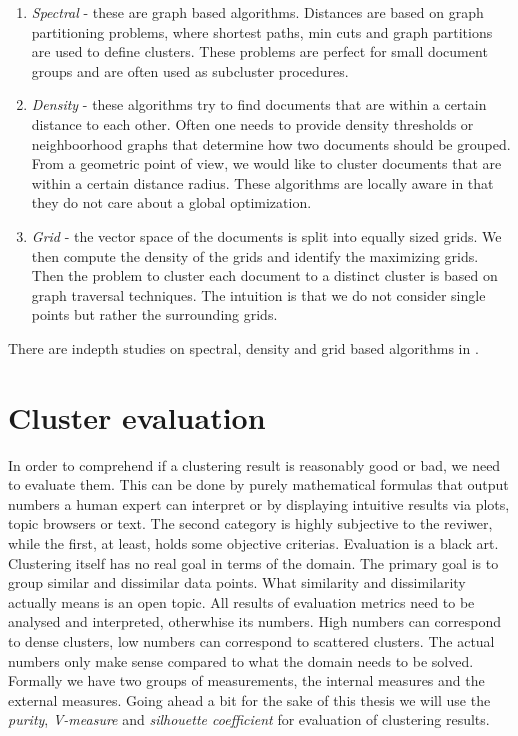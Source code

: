       \begin{enumerate}
        \item \emph{Spectral} - these are graph based algorithms. Distances are based on graph partitioning problems, where shortest paths, min cuts and graph partitions are used to define clusters. These problems are perfect for small document groups and are often used as subcluster procedures.
        \item \emph{Density} - these algorithms try to find documents that are within a certain distance to each other. Often one needs to provide density thresholds or neighboorhood graphs that determine how two documents should be grouped. From a geometric point of view, we would like to cluster documents that are within a certain distance radius. These algorithms are locally aware in that they do not care about a global optimization.
        \item \emph{Grid} - the vector space of the documents is split into equally sized grids. We then compute the density of the grids and identify the maximizing grids. Then the problem to cluster each document to a distinct cluster is based on graph traversal techniques. The intuition is that we do not consider single points but rather the surrounding grids.
      \end{enumerate}

    There are indepth studies on spectral, density and grid based algorithms in \cite{ClusteringBooAggarwalk2013}.


\section{Cluster evaluation}
\label{sec:evaluation}

  In order to comprehend if a clustering result is reasonably good or bad, we need to evaluate them. This can be done by purely mathematical formulas that output numbers a human expert can interpret or by displaying intuitive results via plots, topic browsers or text. The second category is highly subjective to the reviwer, while the first, at least, holds some objective criterias. Evaluation is a black art. Clustering itself has no real goal in terms of the domain. The primary goal is to group similar and dissimilar data points. What similarity and dissimilarity actually means is an open topic. All results of evaluation metrics need to be analysed and interpreted, otherwhise its numbers. High numbers can correspond to dense clusters, low numbers can correspond to scattered clusters. The actual numbers only make sense compared to what the domain needs to be solved.\\
  Formally we have two groups of measurements, the internal measures and the external measures. Going ahead a bit for the sake of this thesis we will use the \emph{purity}, \emph{V-measure} and \emph{silhouette coefficient} for evaluation of clustering results.

